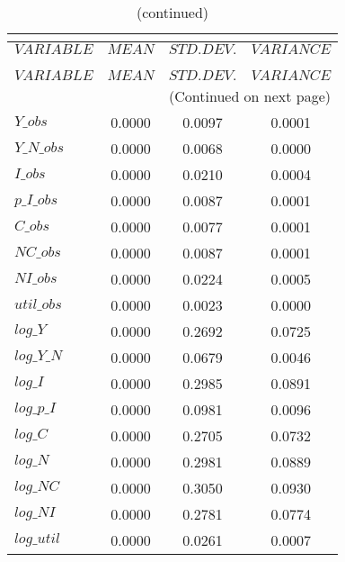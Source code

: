  
\begin{center}
\begin{longtable}{lccc} 
\caption{THEORETICAL MOMENTS}\\
 \label{Table:th_moments}\\
\toprule 
$VARIABLE   $	 & 	 $         MEAN$	 & 	 $    STD. DEV.$	 & 	 $     VARIANCE$\\
\midrule \endfirsthead 
\caption{(continued)}\\
 \toprule \\ 
$VARIABLE   $	 & 	 $         MEAN$	 & 	 $    STD. DEV.$	 & 	 $     VARIANCE$\\
\midrule \endhead 
\midrule \multicolumn{4}{r}{(Continued on next page)} \\ \bottomrule \endfoot 
\bottomrule \endlastfoot 
$Y\_obs     $	 & 	       0.0000	 & 	       0.0097	 & 	       0.0001 \\ 
$Y\_N\_obs  $	 & 	       0.0000	 & 	       0.0068	 & 	       0.0000 \\ 
$I\_obs     $	 & 	       0.0000	 & 	       0.0210	 & 	       0.0004 \\ 
$p\_I\_obs  $	 & 	       0.0000	 & 	       0.0087	 & 	       0.0001 \\ 
$C\_obs     $	 & 	       0.0000	 & 	       0.0077	 & 	       0.0001 \\ 
$NC\_obs    $	 & 	       0.0000	 & 	       0.0087	 & 	       0.0001 \\ 
$NI\_obs    $	 & 	       0.0000	 & 	       0.0224	 & 	       0.0005 \\ 
$util\_obs  $	 & 	       0.0000	 & 	       0.0023	 & 	       0.0000 \\ 
$log\_Y     $	 & 	       0.0000	 & 	       0.2692	 & 	       0.0725 \\ 
$log\_Y\_N  $	 & 	       0.0000	 & 	       0.0679	 & 	       0.0046 \\ 
$log\_I     $	 & 	       0.0000	 & 	       0.2985	 & 	       0.0891 \\ 
$log\_p\_I  $	 & 	       0.0000	 & 	       0.0981	 & 	       0.0096 \\ 
$log\_C     $	 & 	       0.0000	 & 	       0.2705	 & 	       0.0732 \\ 
$log\_N     $	 & 	       0.0000	 & 	       0.2981	 & 	       0.0889 \\ 
$log\_NC    $	 & 	       0.0000	 & 	       0.3050	 & 	       0.0930 \\ 
$log\_NI    $	 & 	       0.0000	 & 	       0.2781	 & 	       0.0774 \\ 
$log\_util  $	 & 	       0.0000	 & 	       0.0261	 & 	       0.0007 \\ 
\end{longtable}
 \end{center}
